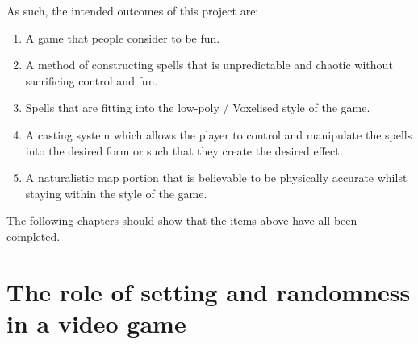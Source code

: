 \documentclass[12pt,a4paper]{report}
\begin{document}
As such, the intended outcomes of this project are:

\begin{enumerate}
	\item A game that people consider to be fun.
	\item A method of constructing spells that is unpredictable and chaotic without sacrificing control and fun.
	\item Spells that are fitting into the low-poly / Voxelised style of the game.
	\item A casting system which allows the player to control and manipulate the spells into the desired form or such that they create the desired effect.
	\item A naturalistic map portion that is believable to be physically accurate whilst staying within the style of the game.
\end{enumerate}

The following chapters should show that the items above have all been completed.

\chapter{The role of setting and randomness in a video game} \label{chap1}


\end{document}
